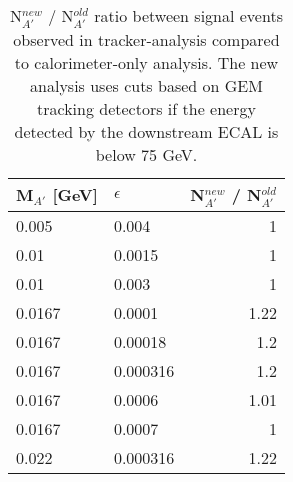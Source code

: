 \begin{center}
\begin{table}
  \centering
  \begin{tabular}{llr}
    \hline
    M$_{A'}$ [GeV]& $\epsilon$ & N$^{new}_{A'}$ / N$^{old}_{A'}$ \\    
    \hline
    0.005  & 0.004    & 1   \\    
    0.01   & 0.0015   & 1   \\    
    0.01   & 0.003    & 1   \\    
    0.0167 & 0.0001   & 1.22\\
    0.0167 & 0.00018  & 1.2 \\    
    0.0167 & 0.000316 & 1.2 \\
    0.0167 & 0.0006   & 1.01\\
    0.0167 & 0.0007   & 1   \\
    0.022  & 0.000316 & 1.22\\
    \hline    
  \end{tabular}
  \caption[ratio between signal events observed in tracker-analysis compared to calorimeter-only analysis]{N$^{new}_{A'}$ / N$^{old}_{A'}$ ratio between signal events observed in tracker-analysis compared to calorimeter-only analysis. The new analysis uses cuts based on GEM tracking detectors if the energy detected by the downstream ECAL is below 75 GeV.}
  \label{tab:dm:efftable}
\end{table}
\end{center}


